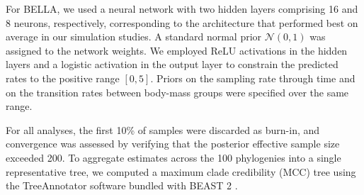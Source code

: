 For BELLA, we used a neural network with two hidden layers comprising 16 and 8 neurons, respectively, corresponding to the architecture that performed best on average in our simulation studies.
A standard normal prior \(\mathcal{N}(0,1)\) was assigned to the network weights.
We employed ReLU activations in the hidden layers and a logistic activation in the output layer to constrain the predicted rates to the positive range \([0,5]\).
Priors on the sampling rate through time and on the transition rates between body-mass groups were specified over the same range.

For all analyses, the first 10\% of samples were discarded as burn-in, and convergence was assessed by verifying that the posterior effective sample size exceeded 200.
To aggregate estimates across the 100 phylogenies into a single representative tree, we computed a maximum clade credibility (MCC) tree using the TreeAnnotator software bundled with BEAST 2 \cite{bouckaert2019beast}.

